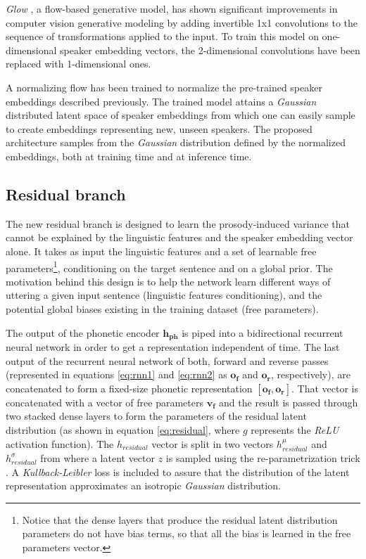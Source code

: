 \textit{Glow} \autocite{kingma2018}, a flow-based generative model, has shown significant improvements in computer vision generative modeling by adding invertible 1x1 convolutions to the sequence of transformations applied to the input. To train this model on one-dimensional speaker embedding vectors, the 2-dimensional convolutions have been replaced with 1-dimensional ones.

A normalizing flow has been trained to normalize the pre-trained speaker embeddings described previously. The trained model attains a \textit{Gaussian} distributed latent space of speaker embeddings from which one can easily sample to create embeddings representing new, unseen speakers. The proposed architecture samples from the \textit{Gaussian} distribution defined by the normalized embeddings, both at training time and at inference time.


\subsection{Residual branch}
The new residual branch is designed to learn the prosody-induced variance that cannot be explained by the linguistic features and the speaker embedding vector alone. It takes as input the linguistic features and a set of learnable free parameters\footnote{Notice that the dense layers that produce the residual latent distribution parameters do not have bias terms, so that all the bias is learned in the free parameters vector.}, conditioning on the target sentence and on a global prior. The motivation behind this design is to help the network learn different ways of uttering a given input sentence (linguistic features conditioning), and the potential global biases existing in the training dataset (free parameters).

The output of the phonetic encoder $\mathbf{h_{\text{ph}}}$ is piped into a bidirectional recurrent neural network \autocite{schuster1997,graves2005} in order to get a representation independent of time. The last output of the recurrent neural network of both, forward and reverse passes (represented in equations \ref{eq:rnn1} and \ref{eq:rnn2} as $\mathbf{o_f}$ and $\mathbf{o_r}$, respectively), are  concatenated to form a fixed-size phonetic representation $[\mathbf{o_f}, \mathbf{o_r}]$. That vector is concatenated with a vector of free parameters $\mathbf{v_f}$ and the result is passed through two stacked dense layers to form the parameters of the residual latent distribution (as shown in equation \ref{eq:residual}, where $g$ represents the \textit{ReLU} activation function). The $h_{residual}$ vector is split in two vectors $h_{residual}^{\mu}$ and $h_{residual}^{\sigma}$ from where a latent vector $z$ is sampled using the re-parametrization trick \autocite{kingma2019}. A \textit{Kullback-Leibler} loss is included to assure that the distribution of the latent representation approximates an isotropic \textit{Gaussian} distribution.

